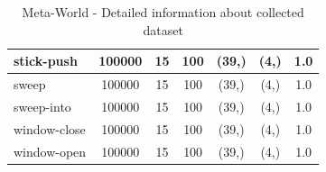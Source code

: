 \documentclass{article}
\theoremstyle{plain}
\theoremstyle{definition}
\theoremstyle{remark}
\begin{document}
\begin{table}[]
{\begin{tabular}{|l|c|c|c|c|c|c|}
stick-push                          & 100000                                        & 15                                                   & 100                                             & (39,)                                           & (4,) & 1.0                                            \\ \hline
sweep                               & 100000                                        & 15                                                   & 100                                             & (39,)                                           & (4,) & 1.0                                            \\ \hline
sweep-into                          & 100000                                        & 15                                                   & 100                                             & (39,)                                           & (4,) & 1.0                                            \\ \hline
window-close                        & 100000                                        & 15                                                   & 100                                             & (39,)                                           & (4,) & 1.0                                            \\ \hline
window-open                         & 100000                                        & 15                                                   & 100                                             & (39,)                                           & (4,) & 1.0                                            \\ \hline
    \end{tabular}
}
    \caption{Meta-World - Detailed information about collected dataset}
    \label{dataset-info:metaworld}
\end{table}
\end{document}
